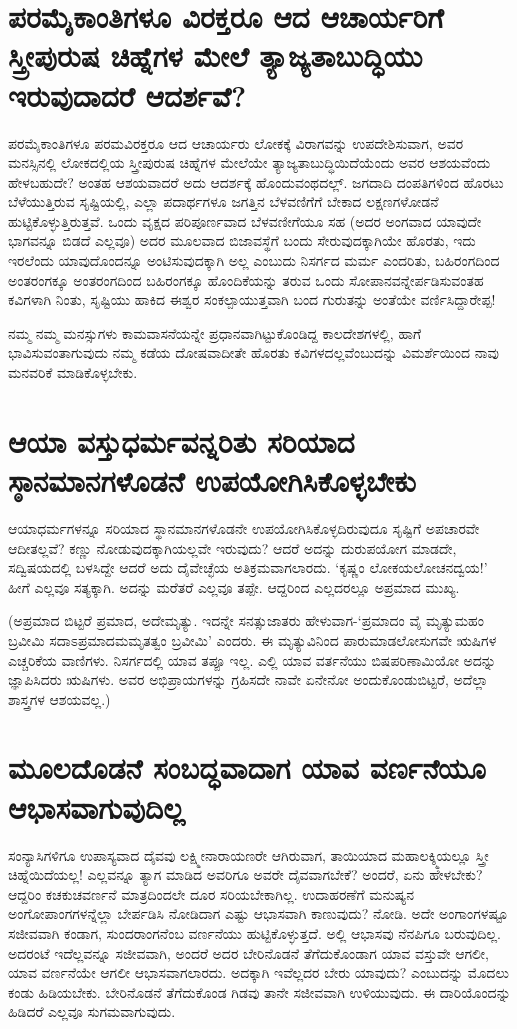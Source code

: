 \section*{ಪರಮೈಕಾಂತಿಗಳೂ ವಿರಕ್ತರೂ ಆದ ಆಚಾರ್ಯರಿಗೆ  ಸ್ತ್ರೀಪುರುಷ ಚಿಹ್ನೆಗಳ ಮೇಲೆ ತ್ಯಾಜ್ಯತಾಬುದ್ಧಿಯು ಇರುವುದಾದರೆ ಆದರ್ಶವೆ?}

ಪರಮೈಕಾಂತಿಗಳೂ ಪರಮವಿರಕ್ತರೂ ಆದ ಆಚಾರ್ಯರು ಲೋಕಕ್ಕೆ ವಿರಾಗವನ್ನು ಉಪದೇಶಿಸುವಾಗ, ಅವರ ಮನಸ್ಸಿನಲ್ಲಿ ಲೋಕದಲ್ಲಿಯ ಸ್ತ್ರೀಪುರುಷ ಚಿಹ್ನೆಗಳ ಮೇಲೆಯೇ ತ್ಯಾಜ್ಯತಾಬುದ್ಧಿಯಿದೆಯೆಂದು ಅವರ ಆಶಯವೆಂದು ಹೇಳಬಹುದೇ? ಅಂತಹ ಆಶಯವಾದರೆ ಅದು ಆದರ್ಶಕ್ಕೆ ಹೊಂದುವಂಥದಲ್ಲ್. ಜಗದಾದಿ ದಂಪತಿಗಳಿಂದ ಹೊರಟು ಬೆಳೆಯುತ್ತಿರುವ ಸೃಷ್ಟಿಯಲ್ಲಿ, ಎಲ್ಲಾ ಪದಾರ್ಥಗಳೂ ಜಗತ್ತಿನ ಬೆಳವಣಿಗೆಗೆ ಬೇಕಾದ ಲಕ್ಷಣಗಳೋಡನೆ ಹುಟ್ಟಿಕೊಳ್ಳುತ್ತಿರುತ್ತವೆ. ಒಂದು ವೃಕ್ಷದ ಪರಿಪೂರ್ಣವಾದ ಬೆಳವಣೀಗೆಯೂ ಸಹ (ಅದರ ಅಂಗವಾದ ಯಾವುದೇ ಭಾಗವನ್ನೂ ಬಿಡದೆ ಎಲ್ಲವೂ) ಅದರ ಮೂಲವಾದ ಬಿಜಾವಸ್ಥೆಗೆ ಬಂದು ಸೇರುವುದಕ್ಕಾಗಿಯೇ ಹೊರತು, ಇದು ಇರಲೆಂದು ಯಾವುದೊಂದನ್ನೂ ಅಂಟಿಸುವುದಕ್ಕಾಗಿ ಅಲ್ಲ ಎಂಬುದು ನಿಸರ್ಗದ ಮರ್ಮ ಎಂದರಿತು, ಬಹಿರಂಗದಿಂದ ಅಂತರಂಗಕ್ಕೂ ಅಂತರಂಗದಿಂದ ಬಹಿರಂಗಕ್ಕೂ ಹೊಂದಿಕೆಯನ್ನು ತರುವ ಒಂದು ಸೋಪಾನವನ್ನೇರ್ಪಡಿಸುವಂತಹ ಕವಿಗಳಾಗಿ ನಿಂತು, ಸೃಷ್ಟಿಯು ಹಾಕಿದ ಈಶ್ವರ ಸಂಕಲ್ಪಾಯುತ್ತವಾಗಿ ಬಂದ ಗುರುತನ್ನು ಅಂತೆಯೇ ವರ್ಣಿಸಿದ್ದಾರೇಪ್ಪ!

ನಮ್ಮ ನಮ್ಮ ಮನಸ್ಸುಗಳು ಕಾಮವಾಸನೆಯನ್ನೇ ಪ್ರಧಾನವಾಗಿಟ್ಟುಕೊಂಡಿದ್ದ ಕಾಲದೇಶಗಳಲ್ಲಿ, ಹಾಗೆ ಭಾವಿಸುವಂತಾಗುವುದು ನಮ್ಮ ಕಡೆಯ ದೋಷವಾದೀತೇ ಹೊರತು ಕವಿಗಳದಲ್ಲವೆಂಬುದನ್ನು ವಿಮರ್ಶೆಯಿಂದ ನಾವು ಮನವರಿಕೆ ಮಾಡಿಕೊಳ್ಳಬೇಕು.

\section*{ಆಯಾ ವಸ್ತುಧರ್ಮವನ್ನರಿತು ಸರಿಯಾದ ಸ್ಠಾನಮಾನಗಳೊಡನೆ ಉಪಯೋಗಿಸಿಕೊಳ್ಳಬೇಕು}

ಆಯಾಧರ್ಮಗಳನ್ನೂ ಸರಿಯಾದ ಸ್ಥಾನಮಾನಗಳೊಡನೇ ಉಪಯೋಗಿಸಿಕೊಳ್ಳದಿರುವುದೂ ಸೃಷ್ಟಿಗೆ ಅಪಚಾರವೇ ಆದೀತಲ್ಲವೆ? ಕಣ್ಣು ನೋಡುವುದಕ್ಕಾಗಿಯಲ್ಲವೇ ಇರುವುದು? ಆದರೆ ಅದನ್ನು ದುರುಪಯೋಗ ಮಾಡದೇ, ಸದ್ವಿಷಯದಲ್ಲಿ ಬಳಸಿದ್ದೇ ಆದರೆ ಅದು ದೈವೇಚ್ಛೆಯ ಅತಿಕ್ರಮವಾಗಲಾರದು. `ಕೃಷ್ಣಂ ಲೋಕಯಲೋಚನದ್ವಯ!' ಹೀಗೆ ಎಲ್ಲವೂ ಸತ್ಯಕ್ಕಾಗಿ. ಅದನ್ನು ಮರೆತರೆ ಎಲ್ಲವೂ ತಪ್ಪೇ. ಆದ್ದರಿಂದ ಎಲ್ಲದರಲ್ಲೂ ಅಪ್ರಮಾದ ಮುಖ್ಯ. 

(ಅಪ್ರಮಾದ ಬಿಟ್ಟರೆ ಪ್ರಮಾದ, ಅದೇಮೃತ್ಯು. ಇದನ್ನೇ ಸನತ್ಸುಜಾತರು ಹೇಳುವಾಗ-`ಪ್ರಮಾದಂ ವೈ ಮೃತ್ಯುಮಹಂ ಬ್ರವೀಮಿ ಸದಾಽಪ್ರಮಾದಮಮೃತತ್ವಂ ಬ್ರವೀಮಿ' ಎಂದರು. ಈ ಮೃತ್ಯುವಿನಿಂದ ಪಾರುಮಾಡಲೋಸುಗವೇ ಋಷಿಗಳ ಎಚ್ಚರಿಕೆಯ ವಾಣಿಗಳು. ನಿಸರ್ಗದಲ್ಲಿ ಯಾವ ತಪ್ಪೂ ಇಲ್ಲ. ಎಲ್ಲಿ ಯಾವ ವರ್ತನೆಯು ಬಿಷಪರಿಣಾಮಿಯೋ ಅದನ್ನು ಜ್ಞಾಪಿಸಿದರು ಋಷಿಗಳು. ಅವರ ಅಭಿಪ್ರಾಯಗಳನ್ನು ಗ್ರಹಿಸದೇ ನಾವೇ ಏನೇನೋ ಅಂದುಕೊಂಡುಬಿಟ್ಟರೆ, ಅದೆಲ್ಲಾ ಶಾಸ್ತ್ರಗಳ ಆಶಯವಲ್ಲ.)

\section*{ಮೂಲದೊಡನೆ ಸಂಬದ್ಧವಾದಾಗ ಯಾವ ವರ್ಣನೆಯೂ ಆಭಾಸವಾಗುವುದಿಲ್ಲ}

ಸಂನ್ಯಾಸಿಗಳಿಗೂ ಉಪಾಸ್ಯವಾದ ದೈವವು ಲಕ್ಷ್ಮೀನಾರಾಯಣರೇ ಆಗಿರುವಾಗ, ತಾಯಿಯಾದ ಮಹಾಲಕ್ಶ್ಮಿಯಲ್ಲೂ ಸ್ತ್ರೀ ಚಿಹ್ನೆಯಿದೆಯಲ್ಲ! ಎಲ್ಲವನ್ನೂ ತ್ಯಾಗ ಮಾಡಿದ ಅವರಿಗೂ ಅವರೇ ದೈವವಾಗಬೇಕೆ? ಅಂದರೆ, ಏನು ಹೇಳಬೇಕು? ಆದ್ದರಿಂ ಕಚಕುಚವರ್ಣನೆ ಮಾತ್ರದಿಂದಲೇ ದೂರ ಸರಿಯಬೇಕಾಗಿಲ್ಲ. ಉದಾಹರಣೆಗೆ ಮನುಷ್ಯನ ಅಂಗೋಪಾಂಗಗಳನ್ನೆಲ್ಲಾ ಬೇರ್ಪಡಿಸಿ ನೋಡಿದಾಗ ಎಷ್ಟು ಆಭಾಸವಾಗಿ ಕಾಣುವುದು? ನೋಡಿ. ಅದೇ ಅಂಗಾಂಗಳಷ್ಟೂ ಸಜೀವವಾಗಿ ಕಂಡಾಗ, ಸುಂದರಾಂಗನೆಂಬ ವರ್ಣನೆಯು ಹುಟ್ಟಿಕೊಳ್ಳುತ್ತದೆ. ಅಲ್ಲಿ ಆಭಾಸವು ನೆನಪಿಗೂ ಬರುವುದಿಲ್ಲ. ಅದರಂಟೆ ಇದೆಲ್ಲವನ್ನೂ ಸಜೀವವಾಗಿ, ಅಂದರೆ ಅದರ ಬೇರಿನೊಡನೆ ತೆಗೆದುಕೊಂಡಾಗ ಯಾವ ವಸ್ತುವೇ ಆಗಲೀ, ಯಾವ ವರ್ಣನೆಯೇ ಆಗಲೀ ಆಭಾಸವಾಗಲಾರದು. ಅದಕ್ಕಾಗಿ ಇವೆಲ್ಲದರ ಬೇರು ಯಾವುದು? ಎಂಬುದನ್ನು ಮೊದಲು ಕಂಡು ಹಿಡಿಯಬೇಕು. ಬೇರಿನೊಡನೆ ತೆಗೆದುಕೊಂಡ ಗಿಡವು ತಾನೇ ಸಜೀವವಾಗಿ ಉಳಿಯುವುದು. ಈ ದಾರಿಯೊಂದನ್ನು ಹಿಡಿದರೆ ಎಲ್ಲವೂ ಸುಗಮವಾಗುವುದು.

